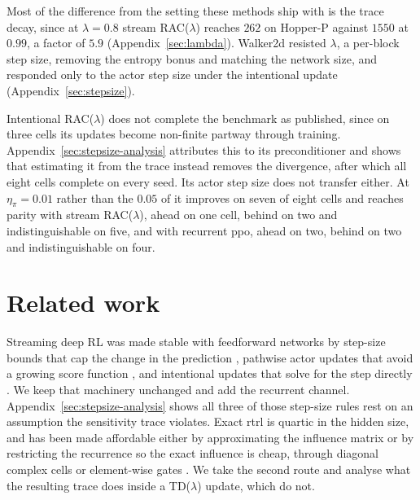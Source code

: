 \documentclass{article}
\begin{document}
Most of the difference from the setting these methods ship with is the trace decay, since at
$\lambda = 0.8$ stream RAC($\lambda$) reaches $262$ on Hopper-P against $1550$ at $0.99$, a
factor of $5.9$ (Appendix~\ref{sec:lambda}). Walker2d resisted $\lambda$, a per-block step size, removing the
entropy bonus and matching the network size, and responded only to the actor step size under the
intentional update (Appendix~\ref{sec:stepsize}).

Intentional RAC($\lambda$) does not complete the benchmark as published, since on three cells its
updates become non-finite partway through training.
Appendix~\ref{sec:stepsize-analysis} attributes this to its preconditioner and shows that
estimating it from the trace instead removes the divergence, after which all eight cells complete
on every seed. Its actor step size does not transfer either. At $\eta_\pi = 0.01$ rather than the
$0.05$ of \citet{sharifnassab2026intentional} it improves on seven of eight cells and reaches
parity with stream RAC($\lambda$), ahead on one cell, behind on two and indistinguishable on five,
and with recurrent \gls{ppo}, ahead on two, behind on two and indistinguishable on four.


\section{Related work}
\label{sec:related}

Streaming deep RL was made stable with feedforward networks by step-size bounds that cap the
change in the prediction \citep{elsayed2024streaming}, pathwise actor updates that avoid a
growing score function \citep{vasan2024deep}, and intentional updates that solve for the step
directly \citep{sharifnassab2026intentional}. We keep that machinery unchanged and add the
recurrent channel. Appendix~\ref{sec:stepsize-analysis} shows all three of those step-size rules
rest on an assumption the sensitivity trace violates. Exact \gls{rtrl}
\citep{williams1989learning} is quartic in the hidden size, and has been made affordable either
by approximating the influence matrix \citep{tallec2017unbiased, menick2021practical,
bellec2020solution} or by restricting the recurrence so the exact influence is cheap, through
diagonal complex cells \citep{orvieto2023resurrecting, zucchet2023online, elelimy2024real} or
element-wise gates \citep{irie2024exploring}. We take the second route and analyse what the
resulting trace does inside a TD($\lambda$) update, which \citet{lemmel2025rtrrl} do not.
\end{document}
